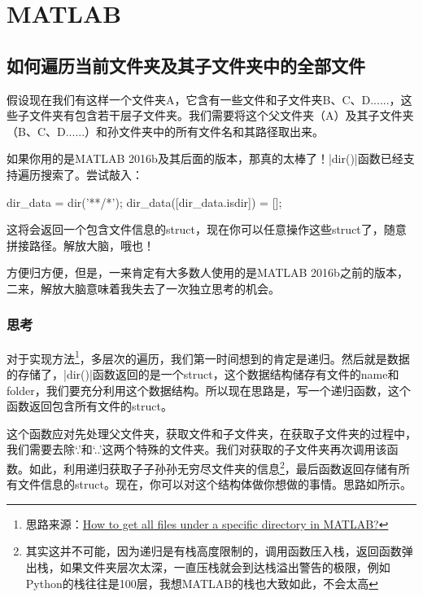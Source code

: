 \chapter{MATLAB}

\section{如何遍历当前文件夹及其子文件夹中的全部文件}

假设现在我们有这样一个文件夹A，它含有一些文件和子文件夹B、C、D......，这些子文件夹有包含若干层子文件夹。我们需要将这个父文件夹（A）及其子文件夹（B、C、D......）和孙文件夹中的所有文件名和其路径取出来。

如果你用的是MATLAB 2016b及其后面的版本，那真的太棒了！\Matlabinline|dir()|函数已经支持遍历搜索了。尝试敲入：

\begin{Matlabcode}
dir_data = dir('**/*');
dir_data([dir_data.isdir]) = [];  %
\end{Matlabcode}

这将会返回一个包含文件信息的struct，现在你可以任意操作这些struct了，随意拼接路径。解放大脑，哦也！

方便归方便，但是，一来肯定有大多数人使用的是MATLAB 2016b之前的版本，二来，解放大脑意味着我失去了一次独立思考的机会。

\subsection*{思考}

对于实现方法\footnote{思路来源：\href{https://stackoverflow.com/questions/2652630/how-to-get-all-files-under-a-specific-directory-in-matlab}{How to get all files under a specific directory in MATLAB?}}，多层次的遍历，我们第一时间想到的肯定是递归。然后就是数据的存储了，\Matlabinline|dir()|函数返回的是一个struct，这个数据结构储存有文件的name和folder，我们要充分利用这个数据结构。所以现在思路是，写一个递归函数，这个函数返回包含所有文件的struct。

这个函数应对先处理父文件夹，获取文件和子文件夹，在获取子文件夹的过程中，我们需要去除`.'和`..'这两个特殊的文件夹。我们对获取的子文件夹再次调用该函数。如此，利用递归获取子子孙孙无穷尽文件夹的信息\footnote{其实这并不可能，因为递归是有栈高度限制的，调用函数压入栈，返回函数弹出栈，如果文件夹层次太深，一直压栈就会到达栈溢出警告的极限，例如Python的栈往往是100层，我想MATLAB的栈也大致如此，不会太高}，最后函数返回存储有所有文件信息的struct。现在，你可以对这个结构体做你想做的事情。思路如所示。

